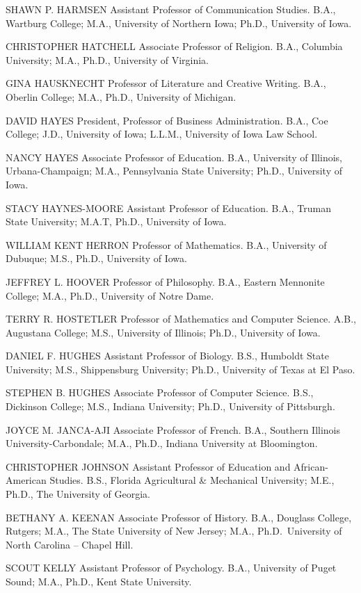 \documentclass[
  letterpaper,
]{scrbook}
\begin{document}
SHAWN P. HARMSEN Assistant Professor of Communication Studies. B.A.,
Wartburg College; M.A., University of Northern Iowa; Ph.D., University
of Iowa.

CHRISTOPHER HATCHELL Associate Professor of Religion. B.A., Columbia
University; M.A., Ph.D., University of Virginia.

GINA HAUSKNECHT Professor of Literature and Creative Writing. B.A.,
Oberlin College; M.A., Ph.D., University of Michigan.

DAVID HAYES President, Professor of Business Administration. B.A., Coe
College; J.D., University of Iowa; L.L.M., University of Iowa Law
School.

NANCY HAYES Associate Professor of Education. B.A., University of
Illinois, Urbana-Champaign; M.A., Pennsylvania State University; Ph.D.,
University of Iowa.

STACY HAYNES-MOORE Assistant Professor of Education. B.A., Truman State
University; M.A.T, Ph.D., University of Iowa.

WILLIAM KENT HERRON Professor of Mathematics. B.A., University of
Dubuque; M.S., Ph.D., University of Iowa.

JEFFREY L. HOOVER Professor of Philosophy. B.A., Eastern Mennonite
College; M.A., Ph.D., University of Notre Dame.

TERRY R. HOSTETLER Professor of Mathematics and Computer Science. A.B.,
Augustana College; M.S., University of Illinois; Ph.D., University of
Iowa.

DANIEL F. HUGHES Assistant Professor of Biology. B.S., Humboldt State
University; M.S., Shippensburg University; Ph.D., University of Texas at
El Paso.

STEPHEN B. HUGHES Associate Professor of Computer Science. B.S.,
Dickinson College; M.S., Indiana University; Ph.D., University of
Pittsburgh.

JOYCE M. JANCA-AJI Associate Professor of French. B.A., Southern
Illinois University-Carbondale; M.A., Ph.D., Indiana University at
Bloomington.

CHRISTOPHER JOHNSON Assistant Professor of Education and
African-American Studies. B.S., Florida Agricultural \& Mechanical
University; M.E., Ph.D., The University of Georgia.

BETHANY A. KEENAN Associate Professor of History. B.A., Douglass
College, Rutgers; M.A., The State University of New Jersey; M.A.,
Ph.D.~University of North Carolina -- Chapel Hill.

SCOUT KELLY Assistant Professor of Psychology. B.A., University of Puget
Sound; M.A., Ph.D., Kent State University.
\end{document}
